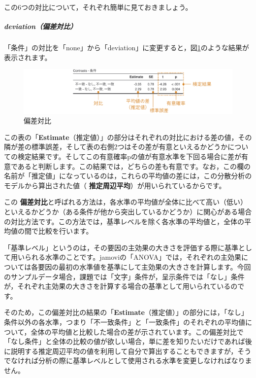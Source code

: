\documentclass[
  12pt,
  a5jpaper,
  lualatex, ja=standard]{bxjsbook}
\renewcommand{\emph}[1]{\textbf{\color{emph} #1}}
\begin{document}
この6つの対比について，それぞれ簡単に見ておきましょう。

\hypertarget{deviationux504fux5deeux5bfeux6bd4}{%
\subparagraph*{deviation（偏差対比）}\label{deviationux504fux5deeux5bfeux6bd4}}

「条件」の対比を「none」から「deviation」に変更すると，図\ref{fig:ANOVA-anova-contrast-deviation}のような結果が表示されます。

\begin{figure}[!ht]

{\centering \includegraphics[width=1\linewidth]{images/ANOVA/anova-contrast-deviation} 

}

\caption{偏差対比}\label{fig:ANOVA-anova-contrast-deviation}
\end{figure}

この表の「\textbf{Estimate}（推定値）」の部分はそれぞれの対比における差の値，その隣が差の標準誤差，そして表の右側2つはその差が有意といえるかどうかについての検定結果です。そしてこの有意確率pの値が有意水準を下回る場合に差が有意であると判断します。この結果では，どちらの差も有意です。なお，この欄の名前が「推定値」になっているのは，これらの平均値の差には，この分散分析のモデルから算出された値（\emph{推定周辺平均}）が用いられているからです。

この\emph{偏差対比}と呼ばれる方法は，各水準の平均値が全体に比べて高い（低い）といえるかどうか（ある条件が他から突出しているかどうか）に関心がある場合の対比方法です。この方法では，基準レベルを除く各水準の平均値と，全体の平均値の間で比較を行います。

「基準レベル」というのは，その要因の主効果の大きさを評価する際に基準として用いられる水準のことです。jamoviの「ANOVA」では，それぞれの主効果については各要因の最初の水準値を基準にして主効果の大きさを計算します。今回のサンプルデータ場合，課題では「文字」条件が，呈示条件では「なし」条件が，それぞれ主効果の大きさを計算する場合の基準として用いられているのです。

そのため，この偏差対比の結果の「\textbf{Estimate}（推定値）」の部分には，「なし」条件以外の各水準，つまり「不一致条件」と「一致条件」のそれぞれの平均値について，全体の平均値と比較した場合の差が示されています。この偏差対比で「なし条件」と全体の比較の値が欲しい場合，単に差を知りたいだけであれば後に説明する推定周辺平均の値を利用して自分で算出することもできますが，そうでなければ分析の際に基準レベルとして使用される水準を変更しなければなりません。
\end{document}
